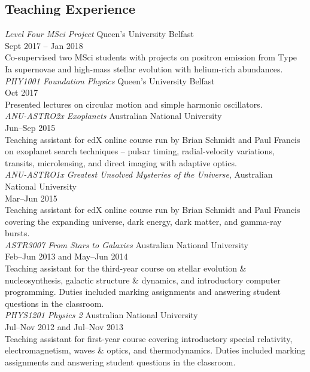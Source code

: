 \documentclass[11pt]{res} %
\begin{document}
\begin{resume}
\section{Teaching Experience}
  {\it Level Four MSci Project} \hfill Queen's University Belfast\\
  \null\hfill Sept 2017 -- Jan 2018\\
  Co-supervised two MSci students with projects on positron emission from Type Ia supernovae
  and high-mass stellar evolution with helium-rich abundances.\\

  {\it PHY1001 Foundation Physics} \hfill Queen's University Belfast\\
  \null\hfill Oct 2017\\
  Presented lectures on circular motion and simple harmonic oscillators.\\

  {\it ANU-ASTRO2x Exoplanets} \hfill Australian National University\\
  \null\hfill Jun--Sep 2015\\
  Teaching assistant for edX online course run by Brian Schmidt and Paul Francis on exoplanet search techniques -- pulsar timing, radial-velocity variations, transits, microlensing, and direct imaging with adaptive optics.\\

  {\it ANU-ASTRO1x Greatest Unsolved Mysteries of the Universe}, \hfill Australian National University\\
  \null\hfill Mar--Jun 2015\\
  Teaching assistant for edX online course run by Brian Schmidt and Paul Francis covering the expanding universe, dark energy, dark matter, and gamma-ray bursts.\\

  {\it ASTR3007 From Stars to Galaxies} \hfill Australian National University\\
  \null\hfill Feb--Jun 2013 and May--Jun 2014\\
  Teaching assistant for the third-year course on stellar evolution \& nucleosynthesis, galactic structure \& dynamics, and introductory computer programming. Duties included marking assignments and answering student questions in the classroom.\\

  {\it PHYS1201 Physics 2} \hfill Australian National University\\
  \null\hfill Jul--Nov 2012 and Jul--Nov 2013\\
  Teaching assistant for first-year course covering introductory special relativity, electromagnetism, waves \& optics, and thermodynamics. Duties included marking assignments and answering student questions in the classroom.


\end{resume}
\end{document}
